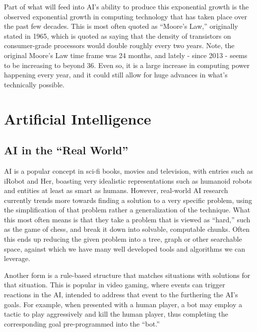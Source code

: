 \documentclass[12pt]{article} %
\begin{document}
Part of what will feed into AI's ability to produce this exponential growth is the observed exponential growth in computing technology that has taken place over the past few decades. This is most often quoted as ``Moore's Law,'' originally stated in 1965, which is quoted as saying that the density of transistors on consumer-grade processors would double roughly every two years. Note, the original Moore's Law time frame was 24 months, and lately - since 2013\cite{mooresslowing} - seems to be increasing to beyond 36. Even so, it is a large increase in computing power happening every year, and it could still allow for huge advances in what's technically possible.


\section{Artificial Intelligence} %


\subsection{AI in the ``Real World''}

AI is a popular concept in sci-fi books, movies and television, with entries such as iRobot and Her, boasting very idealistic representations such as humanoid robots and entities at least as smart as humans. However, real-world AI research currently trends more towards finding a solution to a very specific problem, using the simplification of that problem rather a generalization of the technique. What this most often means is that they take a problem that is viewed as ``hard,'' such as the game of chess, and break it down into solvable, computable chunks. Often this ends up reducing the given problem into a tree, graph or other searchable space, against which we have many well developed tools and algorithms we can leverage.

Another form is a rule-based structure that matches situations with solutions for that situation. This is popular in video gaming, where events can trigger reactions in the AI, intended to address that event to the furthering the AI's goals. For example, when presented with a human player, a bot may employ a tactic to play aggressively and kill the human player, thus completing the corresponding goal pre-programmed into the ``bot.''
\end{document}
